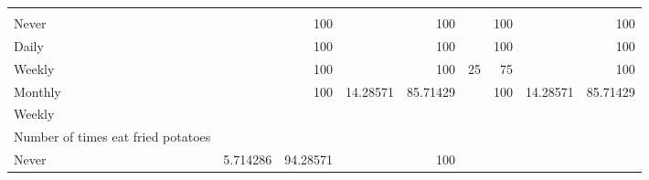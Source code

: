 \documentclass{article}
\begin{document}
\begin{table}[!h]
{\begin{tabular}{lllllllll}
				\multicolumn{1}{r}{} &
				\multicolumn{1}{r}{} &
				\multicolumn{1}{r}{} &
				\multicolumn{1}{r}{} &
				\multicolumn{1}{r}{} &
				\multicolumn{1}{r}{} &
				\multicolumn{1}{r}{} \\
				\multicolumn{1}{l}{\hspace{5em}Never} &
				\multicolumn{1}{|r}{} &
				\multicolumn{1}{r}{100} &
				\multicolumn{1}{r}{} &
				\multicolumn{1}{r}{100} &
				\multicolumn{1}{r}{} &
				\multicolumn{1}{r}{100} &
				\multicolumn{1}{r}{} &
				\multicolumn{1}{r}{100} \\
				\multicolumn{1}{l}{\hspace{5em}Daily} &
				\multicolumn{1}{|r}{} &
				\multicolumn{1}{r}{100} &
				\multicolumn{1}{r}{} &
				\multicolumn{1}{r}{100} &
				\multicolumn{1}{r}{} &
				\multicolumn{1}{r}{100} &
				\multicolumn{1}{r}{} &
				\multicolumn{1}{r}{100} \\
				\multicolumn{1}{l}{\hspace{5em}Weekly} &
				\multicolumn{1}{|r}{} &
				\multicolumn{1}{r}{100} &
				\multicolumn{1}{r}{} &
				\multicolumn{1}{r}{100} &
				\multicolumn{1}{r}{25} &
				\multicolumn{1}{r}{75} &
				\multicolumn{1}{r}{} &
				\multicolumn{1}{r}{100} \\
				\multicolumn{1}{l}{\hspace{5em}Monthly} &
				\multicolumn{1}{|r}{} &
				\multicolumn{1}{r}{100} &
				\multicolumn{1}{r}{14.28571} &
				\multicolumn{1}{r}{85.71429} &
				\multicolumn{1}{r}{} &
				\multicolumn{1}{r}{100} &
				\multicolumn{1}{r}{14.28571} &
				\multicolumn{1}{r}{85.71429} \\
				\multicolumn{1}{l}{\hspace{3em}Weekly} &
				\multicolumn{1}{|r}{} &
				\multicolumn{1}{r}{} &
				\multicolumn{1}{r}{} &
				\multicolumn{1}{r}{} &
				\multicolumn{1}{r}{} &
				\multicolumn{1}{r}{} &
				\multicolumn{1}{r}{} &
				\multicolumn{1}{r}{} \\
				\multicolumn{1}{l}{\hspace{4em}Number of times eat fried potatoes} &
				\multicolumn{1}{|r}{} &
				\multicolumn{1}{r}{} &
				\multicolumn{1}{r}{} &
				\multicolumn{1}{r}{} &
				\multicolumn{1}{r}{} &
				\multicolumn{1}{r}{} &
				\multicolumn{1}{r}{} &
				\multicolumn{1}{r}{} \\
				\multicolumn{1}{l}{\hspace{5em}Never} &
				\multicolumn{1}{|r}{5.714286} &
				\multicolumn{1}{r}{94.28571} &
				\multicolumn{1}{r}{} &
				\multicolumn{1}{r}{100} &

\end{tabular}}
\end{table}
\end{document}
